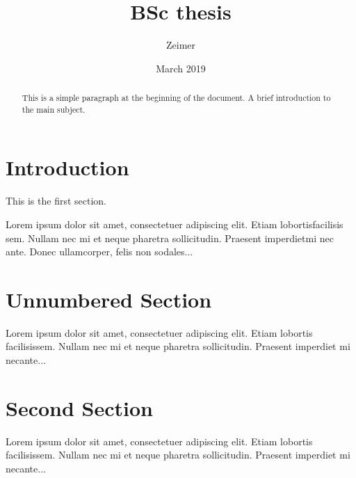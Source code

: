\documentclass[11pt]{article}
\begin{document}
\title{BSc thesis}
\author{Zeimer}
\date{March 2019}

\begin{titlepage}

    \maketitle

    \begin{abstract}
    This is a simple paragraph at the beginning of the document. A brief introduction to the main subject.
    \end{abstract}

    \tableofcontents

\end{titlepage}


\section{Introduction} \label{Introduction}
 
This is the first section.
 
Lorem  ipsum  dolor  sit  amet,  consectetuer  adipiscing  
elit.   Etiam  lobortisfacilisis sem.  Nullam nec mi et 
neque pharetra sollicitudin.  Praesent imperdietmi nec ante. 
Donec ullamcorper, felis non sodales...

\section*{Unnumbered Section}
 
Lorem ipsum dolor sit amet, consectetuer adipiscing elit.  
Etiam lobortis facilisissem.  Nullam nec mi et neque pharetra 
sollicitudin.  Praesent imperdiet mi necante...
 
\section{Second Section}
 
Lorem ipsum dolor sit amet, consectetuer adipiscing elit.  
Etiam lobortis facilisissem.  Nullam nec mi et neque pharetra 
sollicitudin.  Praesent imperdiet mi necante...
\end{document}

